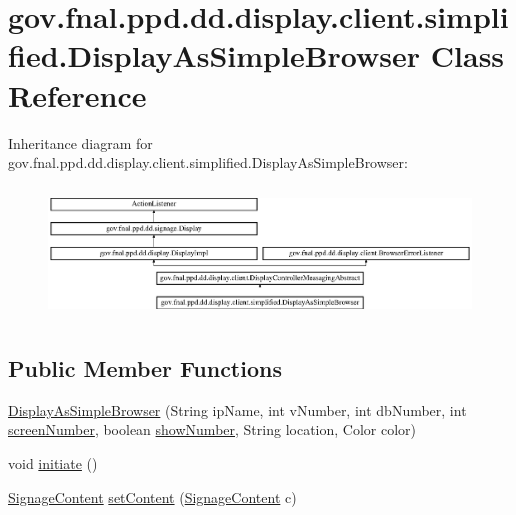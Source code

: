 \hypertarget{classgov_1_1fnal_1_1ppd_1_1dd_1_1display_1_1client_1_1simplified_1_1DisplayAsSimpleBrowser}{\section{gov.\-fnal.\-ppd.\-dd.\-display.\-client.\-simplified.\-Display\-As\-Simple\-Browser Class Reference}
\label{classgov_1_1fnal_1_1ppd_1_1dd_1_1display_1_1client_1_1simplified_1_1DisplayAsSimpleBrowser}
}
Inheritance diagram for gov.\-fnal.\-ppd.\-dd.\-display.\-client.\-simplified.\-Display\-As\-Simple\-Browser\-:\begin{figure}[H]
\begin{center}
\leavevmode
\includegraphics[height=3.526448cm]{classgov_1_1fnal_1_1ppd_1_1dd_1_1display_1_1client_1_1simplified_1_1DisplayAsSimpleBrowser}
\end{center}
\end{figure}
\subsection*{Public Member Functions}
\begin{DoxyCompactItemize}
\item 
\hyperlink{classgov_1_1fnal_1_1ppd_1_1dd_1_1display_1_1client_1_1simplified_1_1DisplayAsSimpleBrowser_a5eebea04df2b0fa101ccbecea55c3ae9}{Display\-As\-Simple\-Browser} (String ip\-Name, int v\-Number, int db\-Number, int \hyperlink{classgov_1_1fnal_1_1ppd_1_1dd_1_1display_1_1DisplayImpl_ace620614bde13cee492129c27f38db4e}{screen\-Number}, boolean \hyperlink{classgov_1_1fnal_1_1ppd_1_1dd_1_1display_1_1client_1_1DisplayControllerMessagingAbstract_aca138d2835d0f3794bc86261ad550f18}{show\-Number}, String location, Color color)
\item 
void \hyperlink{classgov_1_1fnal_1_1ppd_1_1dd_1_1display_1_1client_1_1simplified_1_1DisplayAsSimpleBrowser_a9454e792d76150a173105c3d38d6608f}{initiate} ()
\item 
\hyperlink{interfacegov_1_1fnal_1_1ppd_1_1dd_1_1signage_1_1SignageContent}{Signage\-Content} \hyperlink{classgov_1_1fnal_1_1ppd_1_1dd_1_1display_1_1client_1_1simplified_1_1DisplayAsSimpleBrowser_a7b69290947e6bf32aeb5a78a63b5706f}{set\-Content} (\hyperlink{interfacegov_1_1fnal_1_1ppd_1_1dd_1_1signage_1_1SignageContent}{Signage\-Content} c)
\end{DoxyCompactItemize}
